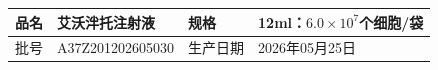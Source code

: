 \documentclass[UTF8,10pt,a4paper,fontset=fandol]{ctexart}
\newcommand{\fieldvalue}[1]{#1}
\begin{document}
\newpage

\begin{center}
\begin{tabular}{|p{2.8cm}|p{4.5cm}|p{2.8cm}|p{4.5cm}|}
\hline
品名 &
\fieldvalue{艾沃泮托注射液} &
规格 &
\fieldvalue{12ml：$6.0\times10^{7}$个细胞/袋}
\\ \hline
批号 &
\fieldvalue{A37Z201202605030} &
生产日期 &
\fieldvalue{2026年05月25日}
\\ \hline
\end{tabular}

\vspace{2mm}


\end{center}
\end{document}
